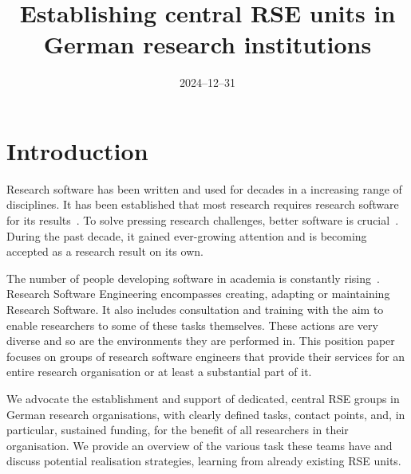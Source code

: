 \documentclass[a4paper]{article}
\title{Establishing central RSE units in German research institutions}
\date{2024--12--31}
\begin{document}
\maketitle

\section{Introduction}
Research software has been written and used for decades in a increasing range of disciplines.
It has been established that most research requires research software for its results~\autocite{Hannay2009, Hettrick2015}.
To solve pressing research challenges, better software is crucial~\autocite{Goble2014}.
During the past decade, it gained ever-growing attention and is becoming accepted as a research result on its own.

The number of people developing software in academia is constantly rising~\autocite{Hannay2009, Hettrick2015}.
Research Software Engineering encompasses creating, adapting or maintaining Research Software.
It also includes consultation and training with the aim to enable researchers to some of these tasks themselves.
These actions are very diverse and so are the environments they are performed in.
This position paper focuses on groups of research software engineers that provide their services for an entire research organisation or at least a substantial part of it.

We advocate the establishment and support of dedicated, central RSE groups in German research organisations, with clearly defined tasks, contact points, and, in particular, sustained funding, for the benefit of all researchers in their organisation.
We provide an overview of the various task these teams have and discuss potential realisation strategies, learning from already existing RSE units.
\end{document}
